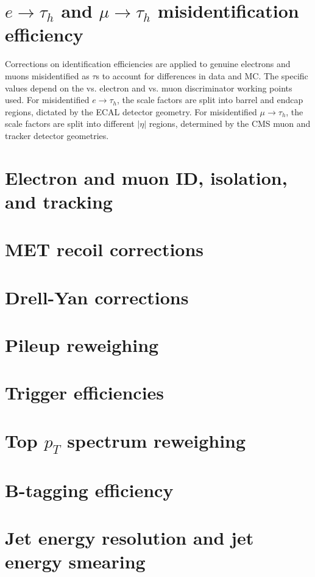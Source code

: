 \section{$e \rightarrow \tau_{h}$ and $\mu \rightarrow \tau_{h}$ misidentification efficiency}
Corrections on identification efficiencies are applied to genuine electrons and muons misidentified as $\tau$s to account for differences in data and MC. The specific values depend on the vs. electron and vs. muon discriminator working points used. For misidentified $e \rightarrow \tau_{h}$, the scale factors are split into barrel and endcap regions, dictated by the ECAL detector geometry. For misidentified $\mu \rightarrow \tau_{h}$, the scale factors are split into different $|\eta|$ regions, determined by the CMS muon and tracker detector geometries.


\section{Electron and muon ID, isolation, and tracking}


\section{MET recoil corrections}


\section{Drell-Yan corrections}

\section{Pileup reweighing}


\section{Trigger efficiencies}

\section{Top $p_{T}$ spectrum reweighing}


\section{B-tagging efficiency}

\section{Jet energy resolution and jet energy smearing}